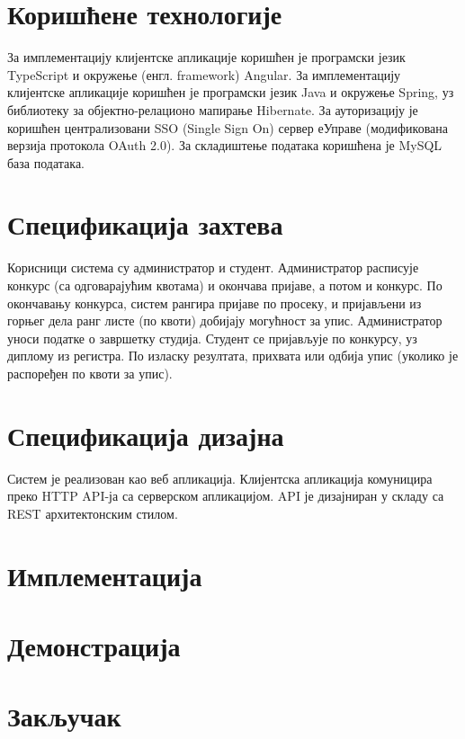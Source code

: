 \documentclass[a4paper]{article}
\begin{document}
\section*{Коришћене технологије}

За имплементацију клијентске апликације коришћен је програмски језик TypeScript и окружење (енгл. framework) Angular.
За имплементацију клијентске апликације коришћен је програмски језик Java и окружење Spring, уз библиотеку
за објектно-релационо мапирање Hibernate.
За ауторизацију је коришћен централизовани SSO (Single Sign On) сервер еУправе (модификована верзија протокола OAuth 2.0).
За складиштење података коришћена је MySQL база података.

\section*{Спецификација захтева}

Корисници система су администратор и студент. Администратор расписује конкурс (са одговарајућим квотама) и окончава пријаве,
а потом и конкурс. По окончавању конкурса, систем рангира пријаве по просеку, и пријављени из горњег дела ранг листе
(по квоти) добијају могућност за упис. Администратор уноси податке о завршетку студија. Студент се пријављује по конкурсу, уз диплому из регистра. По изласку резултата, прихвата или одбија упис (уколико је распоређен по квоти за упис).

\section*{Спецификација дизајна}

Систем је реализован као веб апликација. Клијентска апликација комуницира преко HTTP API-ја са серверском апликацијом. API је
дизајниран у складу са REST архитектонским стилом.

\section*{Имплементација}

\section*{Демонстрација}

\section*{Закључак}
\end{document}
